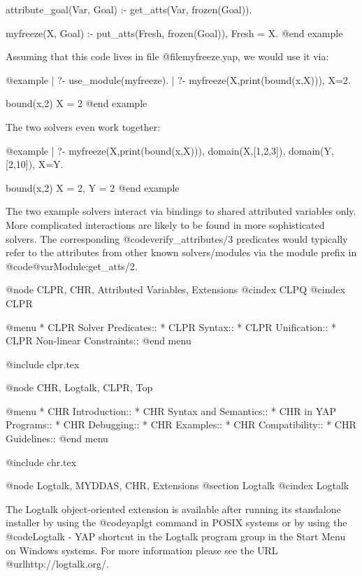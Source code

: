 attribute_goal(Var, Goal) :-                %
        get_atts(Var, frozen(Goal)).

myfreeze(X, Goal) :-
        put_atts(Fresh, frozen(Goal)),
        Fresh = X.
@end example

Assuming that this code lives in file @file{myfreeze.yap},
we would use it via:

@example
| ?- use_module(myfreeze).
| ?- myfreeze(X,print(bound(x,X))), X=2.

bound(x,2)                      %
X = 2                           %
@end example

The two solvers even work together:

@example
| ?- myfreeze(X,print(bound(x,X))), domain(X,[1,2,3]),
     domain(Y,[2,10]), X=Y.

bound(x,2)                      %
X = 2,                          %
Y = 2
@end example

The two example solvers interact via bindings to shared attributed
variables only.  More complicated interactions are likely to be found
in more sophisticated solvers.  The corresponding
@code{verify_attributes/3} predicates would typically refer to the
attributes from other known solvers/modules via the module prefix in
@code{@var{Module}:get_atts/2}.

@node CLPR, CHR, Attributed Variables, Extensions
@cindex CLPQ
@cindex CLPR

@menu
* CLPR Solver Predicates::
* CLPR Syntax::
* CLPR Unification::
* CLPR Non-linear Constraints::               
@end menu


@include clpr.tex

@node CHR, Logtalk, CLPR, Top

@menu
* CHR Introduction::            
* CHR Syntax and Semantics::
* CHR in YAP Programs::
* CHR Debugging::               
* CHR Examples::       
* CHR Compatibility::     
* CHR Guidelines::  
@end menu

@include chr.tex

@node Logtalk, MYDDAS, CHR, Extensions
@section Logtalk
@cindex Logtalk

The Logtalk object-oriented extension is available after running its 
standalone installer by using the @code{yaplgt} command in POSIX 
systems or by using the @code{Logtalk - YAP} shortcut in the Logtalk 
program group in the Start Menu on Windows systems. For more information 
please see the URL @url{http://logtalk.org/}.

